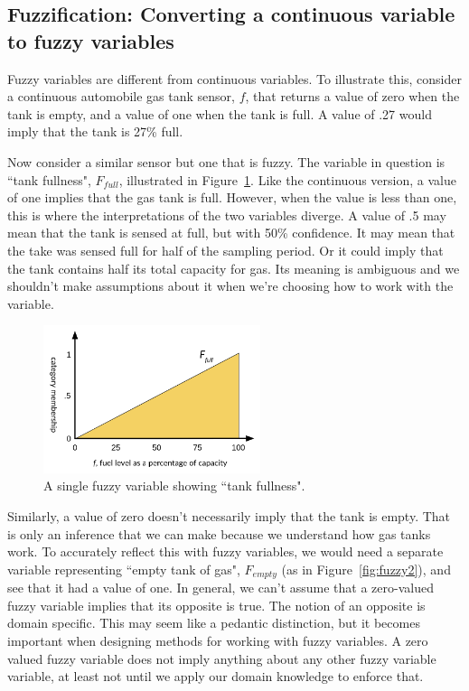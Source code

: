 \subsection{Fuzzification: Converting a continuous variable to fuzzy variables}
\label{subsec:fuzzyconvert}

Fuzzy variables are different from continuous variables.
To illustrate this, consider a continuous automobile gas tank sensor, $f$,
that returns a value of zero when the tank is empty, and a value of one when
the tank is full. A value of .27 would imply that the tank is 27\% full.

Now consider a similar sensor but one that is fuzzy.
The variable in question is ``tank fullness", $F_{full}$,
illustrated in Figure~\ref{fig:fuzzy1}.
Like the continuous version, a value of one implies that the gas tank is full.
However, when the value is less than one, this is where the interpretations
of the two variables diverge.  A value of .5 may mean that the tank is
sensed at full, but with 50\% confidence. It may mean that the take was
sensed full for half of the sampling period. Or it could imply that the
tank contains half its total capacity for gas.
Its meaning is ambiguous and we shouldn't make assumptions about it
when we're choosing how to work with the variable.

\begin{figure}[ht]
\vskip 0.2in
\begin{center}
\centerline{\includegraphics[width=2.5in]{images/fuzzy1.png}}
\caption{A single fuzzy variable showing ``tank fullness".}
\label{fig:fuzzy1}
\end{center}
\vskip -0.2in
\end{figure}

Similarly, a value of zero doesn’t necessarily imply that the tank is empty.
That is only an inference that we can make because we understand how
gas tanks work. To accurately reflect this with fuzzy variables,
we would need a separate variable representing ``empty tank of gas",
$F_{empty}$ (as in Figure~\ref{fig:fuzzy2}),
and see that it had a value of one. In general, we can’t assume
that a zero-valued fuzzy variable implies that its opposite
is true. The notion of an opposite is domain specific. This may seem
like a pedantic distinction, but it becomes important when designing
methods for working with fuzzy variables. A zero valued
fuzzy variable does not imply anything about any other fuzzy variable
variable, at least not until we apply our domain knowledge to enforce that.


